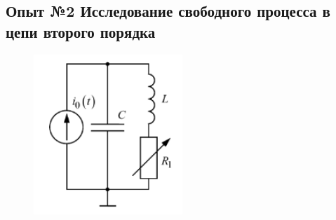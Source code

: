 \documentclass[a4paper,12pt]{report}
\begin{document}
\begin{flushleft}
    \newpage

	\item\subsection*{Опыт №2  Исследование свободного процесса в цепи второго порядка}
	\item
  \begin{figure}[h!]
    \includegraphics[width=0.5\textwidth]{image2.png}
    \label{ris:image3}
\end{figure}


\end{flushleft}
\end{document}
